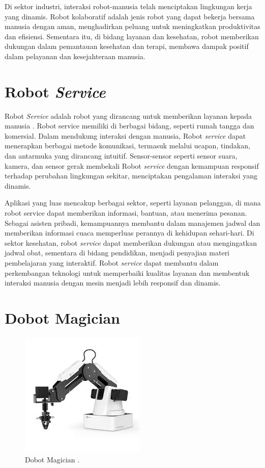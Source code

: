 Di sektor industri, interaksi robot-manusia telah menciptakan lingkungan kerja yang dinamis. Robot kolaboratif adalah jenis robot yang dapat bekerja bersama manusia dengan aman, menghadirkan peluang untuk meningkatkan produktivitas dan efisiensi. Sementara itu, di bidang layanan dan kesehatan, robot memberikan dukungan dalam pemantauan kesehatan dan terapi, membawa dampak positif dalam pelayanan dan kesejahteraan manusia.

\section{Robot \textit{Service}}
Robot \textit{Service} adalah robot yang dirancang untuk memberikan layanan kepada manusia \parencite{electronics10212658}. Robot service memiliki di berbagai bidang, seperti rumah tangga dan komersial. Dalam mendukung interaksi dengan manusia, Robot \textit{service} dapat menerapkan berbagai metode komunikasi, termasuk melalui ucapan, tindakan, dan antarmuka yang dirancang intuitif. Sensor-sensor seperti sensor suara, kamera, dan sensor gerak membekali Robot \textit{service} dengan kemampuan responsif terhadap perubahan lingkungan sekitar, menciptakan pengalaman interaksi yang dinamis.

Aplikasi yang luas mencakup berbagai sektor, seperti layanan pelanggan, di mana robot service dapat memberikan informasi, bantuan, atau menerima pesanan. Sebagai asisten pribadi, kemampuannya membantu dalam manajemen jadwal dan memberikan informasi cuaca memperluas perannya di kehidupan sehari-hari. Di sektor kesehatan, robot \textit{service} dapat memberikan dukungan atau mengingatkan jadwal obat, sementara di bidang pendidikan, menjadi penyajian materi pembelajaran yang interaktif. Robot \textit{service} dapat membantu dalam perkembangan teknologi untuk memperbaiki kualitas layanan dan membentuk interaksi manusia dengan mesin menjadi lebih responsif dan dinamis.

\section{Dobot Magician}
\label{sec:dobot-magician}

\begin{figure}[H]
  \centering

  \includegraphics[scale=0.8]{gambar/dobot.jpeg}

  \caption{Dobot Magician \parencite{dobotus}.}
  \label{fig:roketluarangkasa}
\end{figure}

